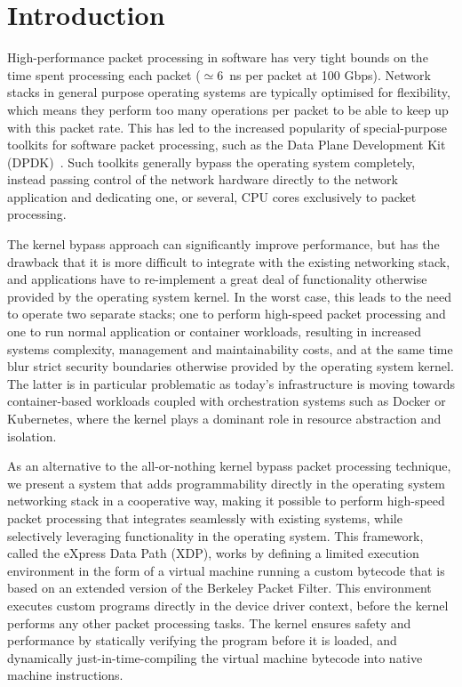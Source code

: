 \documentclass[10pt,sigconf]{acmart}
\begin{document}

\maketitle

\section{Introduction}%
\label{sec:introduction}
High-performance packet processing in software has very tight bounds on the time
spent processing each packet ($\simeq6$~ns per packet at 100 Gbps). Network
stacks in general purpose operating systems are typically optimised for
flexibility, which means they perform too many operations per packet to be able
to keep up with this packet rate. This has led to the increased popularity of
special-purpose toolkits for software packet processing, such as the Data Plane
Development Kit (DPDK)~\cite{dpdk}. Such toolkits generally bypass the operating
system completely, instead passing control of the network hardware directly to
the network application and dedicating one, or several, CPU cores exclusively to
packet processing.

The kernel bypass approach can significantly improve performance, but has the
drawback that it is more difficult to integrate with the existing networking
stack, and applications have to re-implement a great deal of functionality
otherwise provided by the operating system kernel. In the worst case, this leads
to the need to operate two separate stacks; one to perform high-speed packet
processing and one to run normal application or container workloads, resulting
in increased systems complexity, management and maintainability costs, and at
the same time blur strict security boundaries otherwise provided by the
operating system kernel. The latter is in particular problematic as today's
infrastructure is moving towards container-based workloads coupled with
orchestration systems such as Docker or Kubernetes, where the kernel plays a
dominant role in resource abstraction and isolation.

As an alternative to the all-or-nothing kernel bypass packet processing
technique, we present a system that adds programmability directly in the
operating system networking stack in a cooperative way, making it possible to
perform high-speed packet processing that integrates seamlessly with existing
systems, while selectively leveraging functionality in the operating system.
This framework, called the eXpress Data Path (XDP), works by defining a limited
execution environment in the form of a virtual machine running a custom bytecode
that is based on an extended version of the Berkeley Packet Filter. This
environment executes custom programs directly in the device driver context,
before the kernel performs any other packet processing tasks. The kernel ensures
safety and performance by statically verifying the program before it is loaded,
and dynamically just-in-time-compiling the virtual machine bytecode into native
machine instructions.
\end{document}
